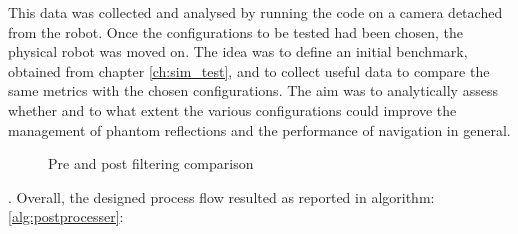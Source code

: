 This data was collected and analysed by running the code on a camera detached from the robot. Once the configurations to be tested had been chosen, the physical robot was moved on. The idea was to define an initial benchmark, obtained from chapter \ref{ch:sim_test}, and to collect useful data to compare the same metrics with the chosen configurations. The aim was to analytically assess whether and to what extent the various configurations could improve the management of phantom reflections and the performance of navigation in general.
\begin{figure}[H]
     \centering
     \hfill
     \caption{Pre and post filtering comparison}
     \label{tiled_floor}
\end{figure}.
\newpage
Overall, the designed process flow resulted as reported in algorithm:
\ref{alg:postprocesser}:

